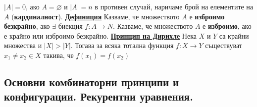 \documentclass{article}
\begin{document}
$|A| = 0$, ако $A = \varnothing$ и $|A| = n$ в противен случай, наричаме брой на елементите на $A$ (\textbf{кардиналност}). \newline\newline
\textbf{\underline{Дефиниция}}
Казваме, че множеството $A$ е \textbf{изброимо безкрайно}, ако $\exists \text { биекция } f : A \rightarrow N$.
Казваме, че множеството $A$ е \textbf{изброимо}, ако е крайно или изброимо безкрайно. \newline\newline
\textbf{\underline{Принцип на Дирихле}}
Нека $X$ и $Y$ са крайни множества и $|X| > |Y|$. Тогава за всяка тотална функция $f : X \rightarrow Y$
съществуват $x_1 \neq x_2 \in X$ такива, че $f(x_1) = f(x_2)$

\subsection*{Основни комбинаторни принципи и конфигурации. Рекурентни уравнения.}
\end{document}
